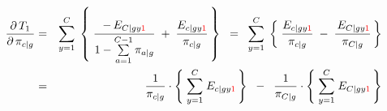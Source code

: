 \begin{eqnarray*}
\dfrac{\partial\,T_{1}}{\partial\,\pi_{c \vert g}}
&=&
	\overset{C}{\underset{y=1}{\sum}}\;
	\left\{\;
		\dfrac{-\,E_{C \vert gy{\color{red}1}}}{1 - \overset{C-1}{\underset{a=1}{\sum}}\,\pi_{a \vert g}}
		\; + \;
		\dfrac{E_{c \vert gy{\color{red}1}}}{\pi_{c \vert g}}
	\,\right\}
	\;\; = \;\;
	\overset{C}{\underset{y=1}{\sum}}\;
	\left\{\;
		\dfrac{E_{c \vert gy{\color{red}1}}}{\pi_{c \vert g}}
		\; - \;
		\dfrac{\,E_{C \vert gy{\color{red}1}}}{\pi_{C \vert g}}
	\,\right\}
\\
&=&
	\dfrac{1}{\pi_{c \vert g}}
	\cdot
	\left\{\;
		\overset{C}{\underset{y=1}{\sum}}\;
		E_{c \vert gy{\color{red}1}}
	\,\right\}
	\;\; - \;\;
	\dfrac{1}{\pi_{C \vert g}}
	\cdot
	\left\{\;
		\overset{C}{\underset{y=1}{\sum}}\;
		E_{C \vert gy{\color{red}1}}
	\,\right\}
\end{eqnarray*}

